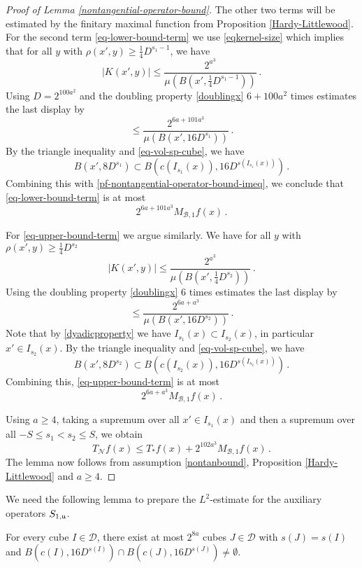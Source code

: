 {\begin{proof}[Proof of Lemma \ref{nontangential-operator-bound}]
    The other two terms will be estimated by the finitary maximal function from Proposition \ref{Hardy-Littlewood}.
    For the second term \eqref{eq-lower-bound-term} we use \eqref{eqkernel-size} which implies that for all $y$ with $\rho(x', y) \ge \frac{1}{4}D^{s_1 - 1}$, we have
    $$
        |K(x', y)| \le \frac{2^{a^3}}{\mu(B(x', \frac{1}{4}D^{s_1 - 1}))}\,.
    $$
    Using $D=2^{100a^2}$
    and the doubling property \eqref{doublingx} $6 +100a^2$ times estimates
    the last display by
    \begin{equation}
    \label{pf-nontangential-operator-bound-imeq}
        \le \frac{2^{6a+101a^3}}{\mu(B(x',  16D^{s_1}))}\, .
    \end{equation}
    By the triangle inequality and \eqref{eq-vol-sp-cube}, we have
    $$
        B(x', 8D^{s_1}) \subset B(c(I_{s_1}(x)), 16D^{s(I_{s_1}(x))})\,.
    $$
    Combining this with \eqref{pf-nontangential-operator-bound-imeq}, we conclude that \eqref{eq-lower-bound-term} is at most
    $$
        2^{6a + 101a^3} M_{\mathcal{B},1} f(x)\,.
    $$

    For \eqref{eq-upper-bound-term} we argue similarly. We have for all $y$ with $\rho(x', y) \ge \frac{1}{4}D^{s_2}$
    $$
        |K(x', y)| \le \frac{2^{a^3}}{\mu(B(x', \frac{1}{4}D^{s_2}))}\,.
    $$
    Using the doubling property \eqref{doublingx} $6$ times estimates
    the last display by
    \begin{equation}
        \le \frac{2^{6a + a^3}}{\mu(B(x',  16 D^{s_2}))}\, .
    \end{equation}
    Note that by \eqref{dyadicproperty} we have $I_{s_1}(x) \subset I_{s_2}(x)$, in particular $x' \in I_{s_2}(x)$.
    By the triangle inequality and \eqref{eq-vol-sp-cube}, we have
    $$
        B(x', 8D^{s_2}) \subset B(c(I_{s_2}(x)), 16D^{s(I_{s_2}(x))})\,.
    $$
    Combining this, \eqref{eq-upper-bound-term} is at most
    $$
        2^{6a+a^3} M_{\mathcal{B},1} f(x)\,.
    $$

    Using $a \ge 4$, taking a supremum over all $x' \in I_{s_1}(x)$ and then a supremum over all $-S \le s_1 < s_2 \le S$, we obtain
    $$
        T_{\mathcal{N}} f(x) \le T_*f(x) + 2^{102a^3}  M_{\mathcal{B},1} f(x)\,.
    $$
    The lemma now follows from assumption \eqref{nontanbound}, Proposition \ref{Hardy-Littlewood} and $a \ge 4$.
\end{proof}

We need the following lemma to prepare the $L^2$-estimate for the auxiliary operators $S_{1, {\mathfrak u}}$.

\begin{lemma}
    \label{boundary-overlap}
    For every cube $I \in \mathcal{D}$, there exist at most $2^{8a}$ cubes $J \in \mathcal{D}$ with $s(J) = s(I)$ and $B(c(I), 16D^{s(I)}) \cap B(c(J), 16 D^{s(J)}) \ne \emptyset$.
\end{lemma}

}
